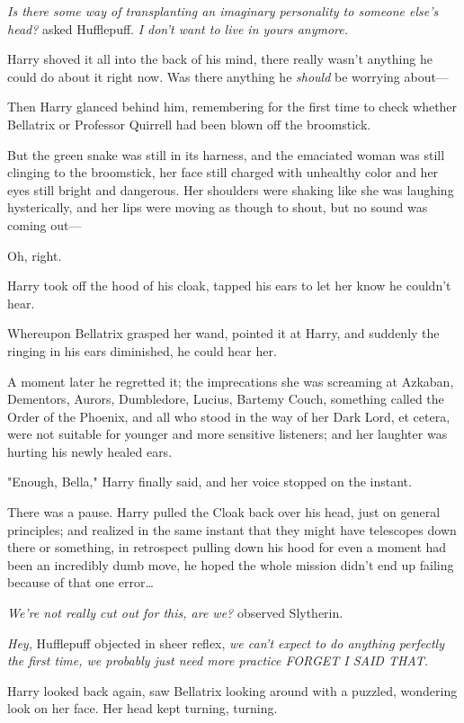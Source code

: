 \emph{Is there some way of transplanting an imaginary personality to someone 
else's head?} asked Hufflepuff. \emph{I don't want to live in yours anymore.}

Harry shoved it all into the back of his mind, there really wasn't anything he 
could do about it right now. Was there anything he \emph{should} be worrying 
about---

Then Harry glanced behind him, remembering for the first time to check whether 
Bellatrix or Professor Quirrell had been blown off the broomstick.

But the green snake was still in its harness, and the emaciated woman was still 
clinging to the broomstick, her face still charged with unhealthy color and her 
eyes still bright and dangerous. Her shoulders were shaking like she was 
laughing hysterically, and her lips were moving as though to shout, but no 
sound was coming out---

Oh, right.

Harry took off the hood of his cloak, tapped his ears to let her know he 
couldn't hear.

Whereupon Bellatrix grasped her wand, pointed it at Harry, and suddenly the 
ringing in his ears diminished, he could hear her.

A moment later he regretted it; the imprecations she was screaming at Azkaban, 
Dementors, Aurors, Dumbledore, Lucius, Bartemy Couch, something called the 
Order of the Phoenix, and all who stood in the way of her Dark Lord, et cetera, 
were not suitable for younger and more sensitive listeners; and her laughter 
was hurting his newly healed ears.

"Enough, Bella," Harry finally said, and her voice stopped on the instant.

There was a pause. Harry pulled the Cloak back over his head, just on general 
principles; and realized in the same instant that they might have telescopes 
down there or something, in retrospect pulling down his hood for even a moment 
had been an incredibly dumb move, he hoped the whole mission didn't end up 
failing because of that one error{\ldots}

\emph{We're not really cut out for this, are we?} observed Slytherin.

\emph{Hey,} Hufflepuff objected in sheer reflex, \emph{we can't expect to do 
anything perfectly the first time, we probably just need more practice FORGET I 
SAID THAT.}

Harry looked back again, saw Bellatrix looking around with a puzzled, wondering 
look on her face. Her head kept turning, turning.

